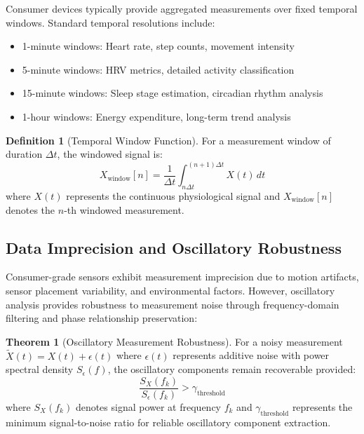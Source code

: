\documentclass[12pt,a4paper]{article}
\theoremstyle{definition}
\newtheorem{definition}{Definition}[section]
\newtheorem{theorem}{Theorem}[section]
\begin{document}
Consumer devices typically provide aggregated measurements over fixed temporal windows. Standard temporal resolutions include:

\begin{itemize}
\item 1-minute windows: Heart rate, step counts, movement intensity
\item 5-minute windows: HRV metrics, detailed activity classification
\item 15-minute windows: Sleep stage estimation, circadian rhythm analysis
\item 1-hour windows: Energy expenditure, long-term trend analysis
\end{itemize}

\begin{definition}[Temporal Window Function]
For a measurement window of duration $\Delta t$, the windowed signal is:
\begin{equation}
X_{\text{window}}[n] = \frac{1}{\Delta t} \int_{n\Delta t}^{(n+1)\Delta t} X(t) \, dt
\end{equation}
where $X(t)$ represents the continuous physiological signal and $X_{\text{window}}[n]$ denotes the $n$-th windowed measurement.
\end{definition}

\subsection{Data Imprecision and Oscillatory Robustness}

Consumer-grade sensors exhibit measurement imprecision due to motion artifacts, sensor placement variability, and environmental factors. However, oscillatory analysis provides robustness to measurement noise through frequency-domain filtering and phase relationship preservation:

\begin{theorem}[Oscillatory Measurement Robustness]
For a noisy measurement $\tilde{X}(t) = X(t) + \epsilon(t)$ where $\epsilon(t)$ represents additive noise with power spectral density $S_\epsilon(f)$, the oscillatory components remain recoverable provided:
\begin{equation}
\frac{S_X(f_k)}{S_\epsilon(f_k)} > \gamma_{\text{threshold}}
\end{equation}
where $S_X(f_k)$ denotes signal power at frequency $f_k$ and $\gamma_{\text{threshold}}$ represents the minimum signal-to-noise ratio for reliable oscillatory component extraction.
\end{theorem}
\end{document}
